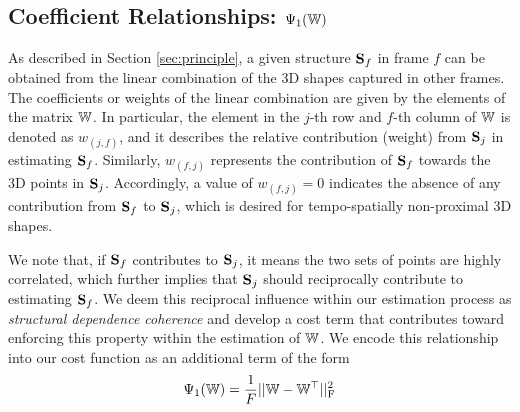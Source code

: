 \subsection{Coefficient Relationships: $\Psi_1(\mathbb W)$}
As described in Section \ref{sec:principle}, a given structure $\mathbf S_f$ in frame $f$ can be obtained from the linear combination of the 3D shapes captured in other frames. The coefficients or weights of the linear combination are given by the elements of the matrix $\mathbb W$. In particular, the element in the $j$-th row and $f$-th column  of $\mathbb W$ is denoted as $w_{(j,f)}$, and it describes the relative contribution (weight) from $\mathbf S_{j}$ in estimating $\mathbf S_{f}$.
Similarly, $w_{(f,j)}$ represents the contribution of $\mathbf S_{f}$ towards the 3D points in $\mathbf S_{j}$.
Accordingly, a value of $w_{(f,j)}=0$ indicates the absence of any contribution from $\mathbf S_{f}$ to $\mathbf S_{j}$, which is desired for tempo-spatially non-proximal 3D shapes.

We note that, if $\mathbf S_{f}$ contributes to $\mathbf S_{j}$, it means the two sets of points are highly correlated, which
further implies that  $\mathbf S_{j}$ should reciprocally contribute to estimating $\mathbf S_{f}$.
We deem this reciprocal influence within our estimation process as {\em structural dependence coherence} and develop a cost term that
contributes toward enforcing this property within the estimation of $\mathbb W$.
We encode this relationship into our cost function as an additional term of the form %
\begin{equation}
\Psi_1(\mathbb W) = \frac{1}{F} ||\mathbb W-\mathbb W^\top||_\text{F}^2
\end{equation}

